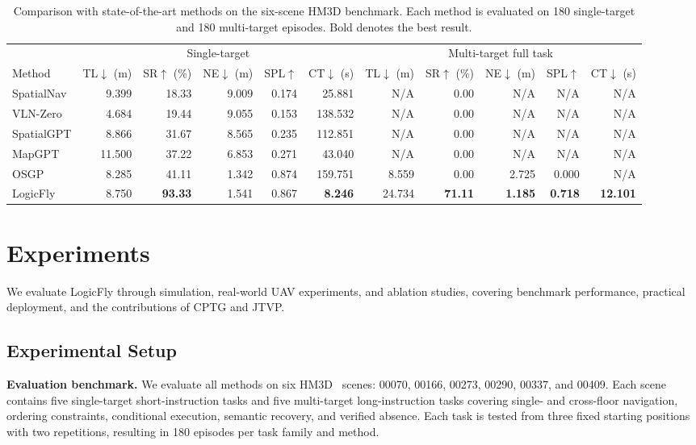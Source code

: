 \documentclass[letterpaper,10pt,conference]{ieeeconf}
\newcommand{\NA}{N/A}
\begin{document}
\begin{table}[t!]
\caption{Comparison with state-of-the-art methods on the six-scene HM3D benchmark. Each method is evaluated on 180 single-target and 180 multi-target episodes. Bold denotes the best result.}
\label{tab:main}\centering\small\setlength{\tabcolsep}{4pt}
\begin{tabular}{lrrrrrrrrrr}\toprule
&\multicolumn{5}{c}{Single-target}&\multicolumn{5}{c}{Multi-target full task}\\
\cmidrule(lr){2-6}\cmidrule(lr){7-11}
Method&TL$\downarrow$ (m)&SR$\uparrow$ (\%)&NE$\downarrow$ (m)&SPL$\uparrow$&CT$\downarrow$ (s)&TL$\downarrow$ (m)&SR$\uparrow$ (\%)&NE$\downarrow$ (m)&SPL$\uparrow$&CT$\downarrow$ (s)\\\midrule
SpatialNav&9.399&18.33&9.009&0.174&25.881&\NA&0.00&\NA&\NA&\NA\\
VLN-Zero&4.684&19.44&9.055&0.153&138.532&\NA&0.00&\NA&\NA&\NA\\
SpatialGPT&8.866&31.67&8.565&0.235&112.851&\NA&0.00&\NA&\NA&\NA\\
MapGPT&11.500&37.22&6.853&0.271&43.040&\NA&0.00&\NA&\NA&\NA\\
OSGP&8.285&41.11&1.342&0.874&159.751&8.559&0.00&2.725&0.000&\NA\\
LogicFly&8.750&\textbf{93.33}&1.541&0.867&\textbf{8.246}&24.734&\textbf{71.11}&\textbf{1.185}&\textbf{0.718}&\textbf{12.101}\\\bottomrule
\end{tabular}
\end{table}

\section{Experiments}
We evaluate LogicFly through simulation, real-world UAV experiments, and ablation studies, covering benchmark performance, practical deployment, and the contributions of CPTG and JTVP.

\subsection{Experimental Setup}
\textbf{Evaluation benchmark.}
We evaluate all methods on six HM3D~\cite{ramakrishnan2021hm3d} scenes: 00070, 00166, 00273, 00290, 00337, and 00409. Each scene contains five single-target short-instruction tasks and five multi-target long-instruction tasks covering single- and cross-floor navigation, ordering constraints, conditional execution, semantic recovery, and verified absence. Each task is tested from three fixed starting positions with two repetitions, resulting in 180 episodes per task family and method.
\end{document}
